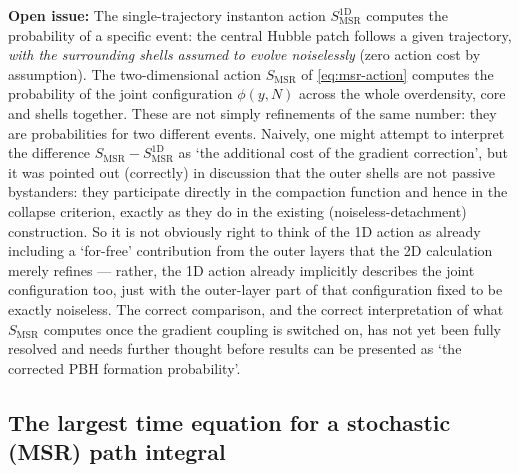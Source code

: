 \documentclass[a4paper,11pt]{article}
\newenvironment{todo}{\begin{tcolorbox}[enhanced,breakable,colback=SussexBurntOrange!10,colframe=SussexBurntOrange!40]\small{\textsf{\textbf{Open issue:} }}}{\end{tcolorbox}}
\newcommand{\Ny}{N}                          %
\newcommand{\field}{\phi}                    %
\newcommand{\yco}{y}                         %
\begin{document}
\begin{todo}
The single-trajectory instanton action $S_{\mathrm{MSR}}^{\mathrm{1D}}$
computes the probability of a specific event: the central Hubble patch
follows a given trajectory, \emph{with the surrounding shells assumed to
evolve noiselessly} (zero action cost by assumption). The two-dimensional
action $S_{\mathrm{MSR}}$ of \eqref{eq:msr-action} computes the probability
of the joint configuration $\field(\yco,\Ny)$ across the whole overdensity,
core and shells together. These are not simply refinements of the same
number: they are probabilities for two different events. Naively, one
might attempt to interpret the difference $S_{\mathrm{MSR}} -
S_{\mathrm{MSR}}^{\mathrm{1D}}$ as `the additional cost of the gradient
correction', but it was pointed out (correctly) in discussion that the
outer shells are not passive bystanders: they participate directly in the
compaction function and hence in the collapse criterion, exactly as they
do in the existing (noiseless-detachment) construction. So it is not
obviously right to think of the 1D action as already including a
`for-free' contribution from the outer layers that the 2D calculation
merely refines --- rather, the 1D action already implicitly describes the
joint configuration too, just with the outer-layer part of that
configuration fixed to be exactly noiseless. The correct comparison, and
the correct interpretation of what $S_{\mathrm{MSR}}$ computes once the
gradient coupling is switched on, has not yet been fully resolved and
needs further thought before results can be presented as `the corrected
PBH formation probability'.
\end{todo}

\subsection{The largest time equation for a stochastic (MSR) path integral}
\end{document}
